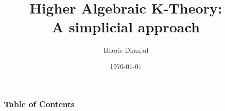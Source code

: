 \documentclass[10pt]{beamer}
\title{Higher Algebraic K-Theory:\\ A simplicial approach}
\subtitle{}
\author{Bhoris Dhanjal}
\institute{Department of Mathematics,\\ University of Mumbai}
\date{\today}
\begin{document}

\begin{frame}
	\maketitle %
\end{frame}




\begin{frame}
	\frametitle{Table of Contents}
	\tableofcontents
\end{frame}
\end{document}
